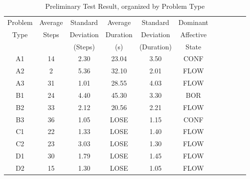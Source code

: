 


\begin{table}[t]
\centering
\caption {Preliminary Test Result, organized by Problem Type}
\label{tab:acc_lit} 
\begin{tabular}{ c  c  c  c  c  c  c  c  c  c  c }
\hline
Problem	&Average 	&Standard 	&Average 		&Standard		&Dominant\\
Type  &Steps   &Deviation   &Duration   &Deviation   &Affective\\
  &   &(Steps)   &(s)   &(Duration)   &State\\ \hline

A1  &14   &2.30   &23.04   &3.50   &CONF\\
A2  &2   &5.36   &32.10   &2.01   &FLOW\\
A3  &31   &1.01   &28.55   &4.03   &FLOW\\
B1  &24   &4.40   &45.30   &3.30   &BOR\\
B2  &33   &2.12   &20.56   &2.21   &FLOW\\
B3  &36   &1.05   &LOSE   &1.15   &CONF\\
C1  &22   &1.33   &LOSE   &1.40   &FLOW\\
C2  &23   &3.03   &LOSE   &1.30   &FLOW\\
D1  &30   &1.79   &LOSE   &1.45   &FLOW\\
D2  &15   &1.30   &LOSE   &1.05   &FLOW\\ \hline
\end{tabular}
\end{table}
